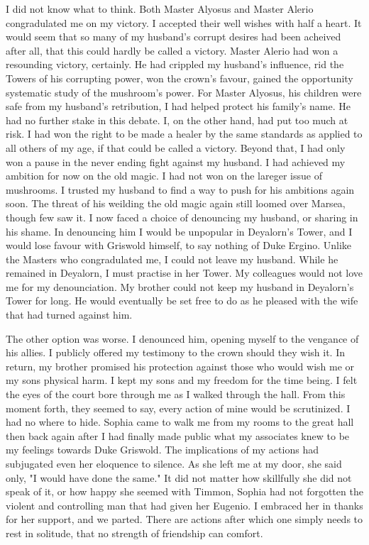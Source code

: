 \documentclass{article}
\begin{document}
I did not know what to think. Both Master Alyosus and Master Alerio congradulated me on my victory. I accepted their well wishes with half a heart. It would seem that so many of my husband's corrupt desires had been acheived after all, that this could hardly be called a victory. Master Alerio had won a resounding victory, certainly. He had crippled my husband's influence, rid the Towers of his corrupting power, won the crown's favour, gained the opportunity systematic study of the mushroom's power. For Master Alyosus, his children were safe from my husband's retribution, I had helped protect his family's name. He had no further stake in this debate. I, on the other hand, had put too much at risk. I had won the right to be made a healer by the same standards as applied to all others of my age, if that could be called a victory. Beyond that, I had only won a pause in the never ending fight against my husband. I had achieved my ambition for now on the old magic. I had not won on the lareger issue of mushrooms. I trusted my husband to find a way to push for his ambitions again soon. The threat of his weilding the old magic again still loomed over Marsea, though few saw it. I now faced a choice of denouncing my husband, or sharing in his shame. In denouncing him I would be unpopular in Deyalorn's Tower, and I would lose favour with Griswold himself, to say nothing of Duke Ergino. Unlike the Masters who congradulated me, I could not leave my husband. While he remained in Deyalorn, I must practise in her Tower. My colleagues would not love me for my denounciation. My brother could not keep my husband in Deyalorn's Tower for long. He would eventually be set free to do as he pleased with the wife that had turned against him.

The other option was worse. I denounced him, opening myself to the vengance of his allies. I publicly offered my testimony to the crown should they wish it. In return, my brother promised his protection against those who would wish me or my sons physical harm. I kept my sons and my freedom for the time being. I felt the eyes of the court bore through me as I walked through the hall. From this moment forth, they seemed to say, every action of mine would be scrutinized. I had no where to hide. Sophia came to walk me from my rooms to the great hall then back again after I had finally made public what my associates knew to be my feelings towards Duke Griswold. The implications of my actions had subjugated even her eloquence to silence. As she left me at my door, she said only, "I would have done the same." It did not matter how skillfully she did not speak of it, or how happy she seemed with Timmon, Sophia had not forgotten the violent and controlling man that had given her Eugenio. I embraced her in thanks for her support, and we parted. There are actions after which one simply needs to rest in solitude, that no strength of friendship can comfort.
\end{document}
